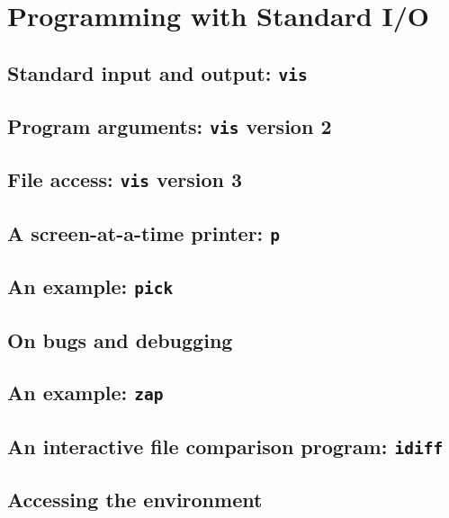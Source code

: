 \chapter{Programming with Standard I/O}
\section{Standard input and output: \texttt{vis}}
\section{Program arguments: \texttt{vis} version 2}
\section{File access: \texttt{vis} version 3}
\section{A screen-at-a-time printer: \texttt{p}}
\section{An example: \texttt{pick}}
\section{On bugs and debugging}
\section{An example: \texttt{zap}}
\section{An interactive file comparison program: \texttt{idiff}}
\section{Accessing the environment}
